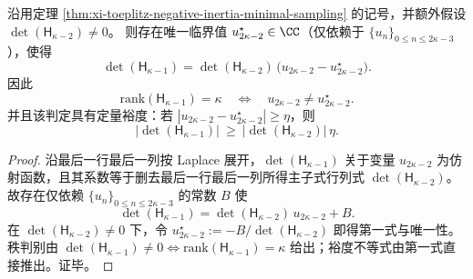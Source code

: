 \begin{proposition}\label{prop:xi-hankel-minimal-sampling-one-point-exception-robust}
沿用定理 \ref{thm:xi-toeplitz-negative-inertia-minimal-sampling} 的记号，并额外假设
\(\det(\mathsf H_{\kappa-2})\neq 0\)。
则存在唯一临界值 \(u_{2\kappa-2}^{\star}\in\CC\)（仅依赖于 \(\{u_n\}_{0\le n\le 2\kappa-3}\)），使得
\[
\det(\mathsf H_{\kappa-1})
=\det(\mathsf H_{\kappa-2})\,\bigl(u_{2\kappa-2}-u_{2\kappa-2}^{\star}\bigr).
\]
因此
\[
\mathrm{rank}(\mathsf H_{\kappa-1})=\kappa
\quad\Longleftrightarrow\quad
u_{2\kappa-2}\neq u_{2\kappa-2}^{\star}.
\]
并且该判定具有定量裕度：若 \(|u_{2\kappa-2}-u_{2\kappa-2}^{\star}|\ge \eta\)，则
\[
\bigl|\det(\mathsf H_{\kappa-1})\bigr|\ \ge\ \bigl|\det(\mathsf H_{\kappa-2})\bigr|\,\eta.
\]
\end{proposition}
\begin{proof}
沿最后一行最后一列按 Laplace 展开，\(\det(\mathsf H_{\kappa-1})\) 关于变量 \(u_{2\kappa-2}\) 为仿射函数，且其系数等于删去最后一行最后一列所得主子式行列式 \(\det(\mathsf H_{\kappa-2})\)。
故存在仅依赖 \(\{u_n\}_{0\le n\le 2\kappa-3}\) 的常数 \(B\) 使
\[
\det(\mathsf H_{\kappa-1})=\det(\mathsf H_{\kappa-2})\,u_{2\kappa-2}+B.
\]
在 \(\det(\mathsf H_{\kappa-2})\neq 0\) 下，令
\(
u_{2\kappa-2}^{\star}:=-B/\det(\mathsf H_{\kappa-2})
\)
即得第一式与唯一性。
秩判别由
\(
\det(\mathsf H_{\kappa-1})\neq 0\iff \mathrm{rank}(\mathsf H_{\kappa-1})=\kappa
\)
给出；裕度不等式由第一式直接推出。证毕。
\end{proof}

